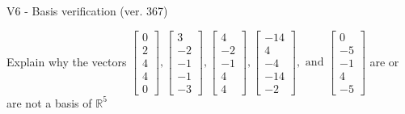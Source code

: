 \begin{exercise}
  \begin{exerciseTitle}V6 - Basis verification (ver. 367)\end{exerciseTitle}
  \begin{exerciseStatement}
    Explain why the vectors \(\left[\begin{array}{r}
0 \\
2 \\
4 \\
4 \\
0
\end{array}\right] , \left[\begin{array}{r}
3 \\
-2 \\
-1 \\
-1 \\
-3
\end{array}\right] , \left[\begin{array}{r}
4 \\
-2 \\
-1 \\
4 \\
4
\end{array}\right] , \left[\begin{array}{r}
-14 \\
4 \\
-4 \\
-14 \\
-2
\end{array}\right] , \text{ and } \left[\begin{array}{r}
0 \\
-5 \\
-1 \\
4 \\
-5
\end{array}\right]\) are or are not a basis of \(\mathbb{R}^5\)	



\end{exerciseStatement}
\end{exercise}
